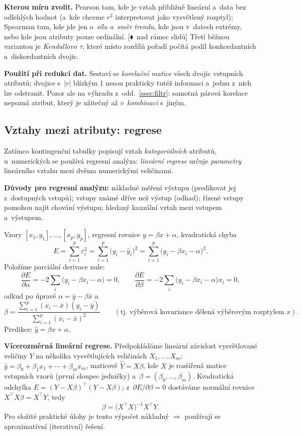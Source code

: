 \documentclass[11pt,a4paper]{article}
\theoremstyle{definition}
\newcommand{\mimo}{\textcolor{markcol}{\textsf{\footnotesize[$\blacklozenge$~nad rámec slidů]}}}
\begin{document}
\textbf{Kterou míru zvolit.} Pearson tam, kde je vztah přibližně lineární a~data bez
odlehlých hodnot (a~kde chceme $r^2$ interpretovat jako vysvětlený rozptyl); Spearman tam, kde
jde jen o~\emph{sílu a~směr trendu}, kde jsou v~datech extrémy, nebo kde jsou atributy pouze
ordinální. \mimo{} Třetí běžnou variantou je \emph{Kendallovo $\tau$}, které místo rozdílů
pořadí počítá podíl konkordantních a~diskordantních dvojic.

\textbf{Použití při redukci dat.} Sestaví se \emph{korelační matice} všech dvojic vstupních
atributů; dvojice s~$|r|$ blízkým 1 nesou prakticky tutéž informaci a~jednu z~nich lze
odstranit. Pozor ale na výhradu z~odd.~\ref{ssec:filtr}: samotná párová korelace nepozná
atribut, který je užitečný až \emph{v~kombinaci} s~jiným.

\subsection{Vztahy mezi atributy: regrese}
\label{ssec:regrese}

Zatímco kontingenční tabulky popisují vztah \emph{kategoriálních} atributů, u~numerických se
používá regresní analýza: \emph{lineární regrese} určuje \emph{parametry} lineárního vztahu
mezi dvěma numerickými veličinami.

\textbf{Důvody pro regresní analýzu:} nákladné měření výstupu (predikovat jej z~dostupných
vstupů); vstupy známé dříve než výstup (odhad); řízené vstupy pomohou najít chování výstupu;
hledaný kauzální vztah mezi vstupem a~výstupem.

\begin{defbox}
Vzory $[x_1,y_1],\dots,[x_p,y_p]$, regresní rovnice $y=\beta x+\alpha$, kvadratická chyba
\[ E=\sum_{i=1}^{p}\varepsilon_i^2=\sum_{i=1}^{p}\big(y_i-\hat y_i\big)^2
   =\sum_{i=1}^{p}\big(y_i-\beta x_i-\alpha\big)^2. \]
Položíme parciální derivace nule:
\[ \frac{\partial E}{\partial\alpha}=-2\sum_i\big(y_i-\beta x_i-\alpha\big)=0,\qquad
   \frac{\partial E}{\partial\beta}=-2\sum_i\big(y_i-\beta x_i-\alpha\big)x_i=0, \]
odkud po úpravě $\alpha=\bar y-\beta\bar x$ a
\[ \beta=\frac{\sum_{i=1}^{p}(x_i-\bar x)(y_i-\bar y)}{\sum_{i=1}^{p}(x_i-\bar x)^2}
   \qquad(\text{tj.\ výběrová kovariance dělená výběrovým rozptylem }x). \]
Predikce: $\hat y=\beta x+\alpha$.
\end{defbox}

\textbf{Vícerozměrná lineární regrese.} Předpokládáme lineární závislost vysvětlované
veličiny $Y$ na několika vysvětlujících veličinách $X_1,\dots,X_m$:
$\hat y=\beta_0+\beta_1x_1+\cdots+\beta_mx_m$, maticově $\hat Y=X\beta$, kde $X$ je
rozšířená matice vstupních vzorů (první sloupec jedničky) a~$\beta=(\beta_0,\dots,\beta_m)$.
Kvadratická odchylka $E=(Y-X\beta)^{\!\top}(Y-X\beta)$; z~$\partial E/\partial\beta=0$
dostáváme normální rovnice $X^{\!\top}\!X\beta=X^{\!\top}Y$, tedy
\[ \beta=\big(X^{\!\top}\!X\big)^{-1}X^{\!\top}Y. \]
Pro složité praktické úlohy je tento výpočet nákladný $\Rightarrow$ používají se aproximativní
(iterativní) řešení.
\end{document}
